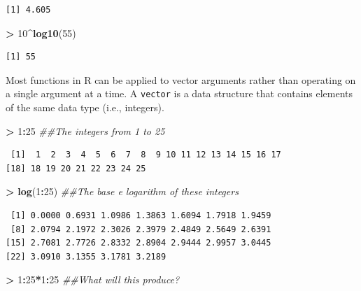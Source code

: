 \documentclass[
]{krantz}
\makeatletter
\newenvironment{Shaded}{\begin{snugshade}}{\end{snugshade}}
\newcommand{\CommentTok}[1]{\textcolor[rgb]{0.37,0.37,0.37}{\textit{#1}}}
\newcommand{\DecValTok}[1]{\textcolor[rgb]{0.06,0.06,0.06}{#1}}
\newcommand{\KeywordTok}[1]{\textcolor[rgb]{0.27,0.27,0.27}{\textbf{#1}}}
\newcommand{\NormalTok}[1]{#1}
\newcommand{\OperatorTok}[1]{\textcolor[rgb]{0.43,0.43,0.43}{\textbf{#1}}}
\newcommand{\StringTok}[1]{\textcolor[rgb]{0.5,0.5,0.5}{#1}}
\newenvironment{kframe}{%
\medskip{}
\setlength{\fboxsep}{.8em}
 \def\at@end@of@kframe{}%
 \ifinner\ifhmode%
  \def\at@end@of@kframe{\end{minipage}}%
  \begin{minipage}{\columnwidth}%
 \fi\fi%
 \def\FrameCommand##1{\hskip\@totalleftmargin \hskip-\fboxsep
 \colorbox{shadecolor}{##1}\hskip-\fboxsep
     \hskip-\linewidth \hskip-\@totalleftmargin \hskip\columnwidth}%
 \MakeFramed {\advance\hsize-\width
   \@totalleftmargin\z@ \linewidth\hsize
   \@setminipage}}%
 {\par\unskip\endMakeFramed%
 \at@end@of@kframe}
\renewenvironment{Shaded}{\begin{kframe}}{\end{kframe}}
\makeatother
\begin{document}
\begin{verbatim}
[1] 4.605
\end{verbatim}

\begin{Shaded}
\begin{Highlighting}[]
\OperatorTok{\textgreater{}}\StringTok{ }\DecValTok{10}\OperatorTok{\^{}}\KeywordTok{log10}\NormalTok{(}\DecValTok{55}\NormalTok{)}
\end{Highlighting}
\end{Shaded}

\begin{verbatim}
[1] 55
\end{verbatim}

Most functions in R can be applied to vector arguments rather than operating on a single argument at a time. A \texttt{vector} is a data structure that contains elements of the same data type (i.e., integers).

\begin{Shaded}
\begin{Highlighting}[]
\OperatorTok{\textgreater{}}\StringTok{ }\DecValTok{1}\OperatorTok{:}\DecValTok{25} \CommentTok{\#\#The integers from 1 to 25}
\end{Highlighting}
\end{Shaded}

\begin{verbatim}
 [1]  1  2  3  4  5  6  7  8  9 10 11 12 13 14 15 16 17
[18] 18 19 20 21 22 23 24 25
\end{verbatim}

\begin{Shaded}
\begin{Highlighting}[]
\OperatorTok{\textgreater{}}\StringTok{ }\KeywordTok{log}\NormalTok{(}\DecValTok{1}\OperatorTok{:}\DecValTok{25}\NormalTok{) }\CommentTok{\#\#The base e logarithm of these integers}
\end{Highlighting}
\end{Shaded}

\begin{verbatim}
 [1] 0.0000 0.6931 1.0986 1.3863 1.6094 1.7918 1.9459
 [8] 2.0794 2.1972 2.3026 2.3979 2.4849 2.5649 2.6391
[15] 2.7081 2.7726 2.8332 2.8904 2.9444 2.9957 3.0445
[22] 3.0910 3.1355 3.1781 3.2189
\end{verbatim}

\begin{Shaded}
\begin{Highlighting}[]
\OperatorTok{\textgreater{}}\StringTok{ }\DecValTok{1}\OperatorTok{:}\DecValTok{25}\OperatorTok{*}\DecValTok{1}\OperatorTok{:}\DecValTok{25} \CommentTok{\#\#What will this produce?}
\end{Highlighting}
\end{Shaded}
\end{document}
